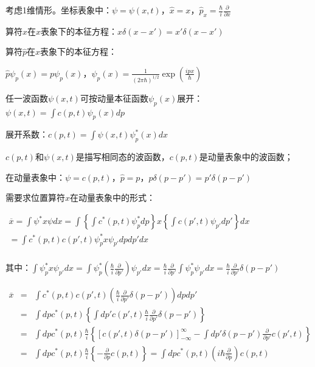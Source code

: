 

考虑1维情形。坐标表象中：$\psi  = \psi \left( {x,t} \right)$，$\widehat x = x$，$\widehat p_x  = \frac{\hbar }{i}\frac{\partial }{{\partial x}}$

算符$\hat x$在$x$表象下的本征方程：$x\delta \left( {x - x'} \right) = x'\delta \left( {x - x'} \right)$

算符$\hat p$在$x$表象下的本征方程：

$\widehat p\psi _p \left( x \right) = p\psi _p \left( x \right)$，$\psi _p \left( x \right) = \frac{1}{{\left( {2\pi \hbar } \right)^{1/2} }}\exp \left( {\frac{{ipx}}{\hbar }} \right)$



任一波函数$\psi \left( {x,t} \right)$可按动量本征函数$\psi _p \left( x \right)$展开：$\psi \left( {x,t} \right) = \int {c\left( {p,t} \right)\psi _p \left( x \right)dp} $

展开系数：$c\left( {p,t} \right) = \int {\psi \left( {x,t} \right)\psi _p^* \left( x \right)dx} $

$c\left( {p,t} \right)$和$\psi \left( {x,t} \right)$是描写相同态的波函数，$c\left( {p,t} \right)$是动量表象中的波函数；

在动量表象中：$\psi  = c\left( {p,t} \right)$，$\widehat p = p$，$p\delta \left( {p - p'} \right) = p'\delta \left( {p - p'} \right)$

需要求位置算符$\hat x$在动量表象中的形式：

$\begin{array}{l}
 \overline x  = \int {\psi ^* x\psi dx}  = \int {\left\{ {\int {c^* \left( {p,t} \right)\psi _p^* dp} } \right\}x\left\{ {\int {c\left( {p',t} \right)\psi _{p'} dp'} } \right\}dx}  \\
  = \int {c^* \left( {p,t} \right)c\left( {p',t} \right)\psi _p^* x\psi _{p'} dpdp'dx}  \\
 \end{array}$


其中：$\int {\psi _p^* x\psi _{p'} dx}  = \int {\psi _p^* \left( {\frac{\hbar }{i}\frac{\partial }{{\partial p'}}} \right)\psi _{p'} dx}  = \frac{\hbar }{i}\frac{\partial }{{\partial p'}}\int {\psi _p^* \psi _{p'} dx}  = \frac{\hbar }{i}\frac{\partial }{{\partial p'}}\delta \left( {p - p'} \right)$

\begin{eqnarray*}
\overline x & = & \int {c^* (p,t)c(p',t)\left( {\frac{\hbar }{i}\frac{\partial }{{\partial p'}}\delta (p - p')} \right)} dpdp' \\
{} & = & \int {dpc^* (p,t)\left\{ {\int {dp'c(p',t)\frac{\hbar }{i}\frac{\partial }{{\partial p'}}\delta (p - p')} } \right\}}  \\
{} & = & \int {dpc^* (p,t)\frac{\hbar }{i}\left\{ {\left[ {c(p',t)\delta (p - p')} \right]_{ - \infty }^\infty   - \int {dp'\delta (p - p')\frac{\partial }{{\partial p'}}c(p',t)} } \right\}}  \\
{} & = & \int {dpc^* (p,t)\frac{\hbar }{i}\left\{ { - \frac{\partial }{{\partial p}}c(p,t)} \right\}}  = \int {dpc^* (p,t)\left( {i\hbar \frac{\partial }{{\partial p}}} \right)c(p,t)}
\end{eqnarray*}

